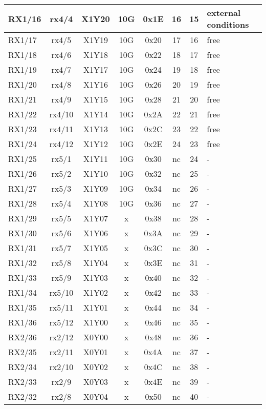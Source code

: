 \begin{longtable}{|l|c|c|c|c|c|c|l|}
RX1/16 & rx4/4  & X1Y20 & 10G & 0x1E & 16 & 15 & external conditions\\\hline
RX1/17 & rx4/5  & X1Y19 & 10G & 0x20 & 17 & 16 & free\\\hline
RX1/18 & rx4/6  & X1Y18 & 10G & 0x22 & 18 & 17 & free\\\hline
RX1/19 & rx4/7  & X1Y17 & 10G & 0x24 & 19 & 18 & free\\\hline
RX1/20 & rx4/8  & X1Y16 & 10G & 0x26 & 20 & 19 & free\\\hline
RX1/21 & rx4/9  & X1Y15 & 10G & 0x28 & 21 & 20 & free\\\hline
RX1/22 & rx4/10 & X1Y14 & 10G & 0x2A & 22 & 21 & free\\\hline
RX1/23 & rx4/11 & X1Y13 & 10G & 0x2C & 23 & 22 & free\\\hline
RX1/24 & rx4/12 & X1Y12 & 10G & 0x2E & 24 & 23 & free\\\hline
RX1/25 & rx5/1  & X1Y11 & 10G & 0x30 & nc & 24 & -\\\hline
RX1/26 & rx5/2  & X1Y10 & 10G & 0x32 & nc & 25 & -\\\hline
RX1/27 & rx5/3  & X1Y09 & 10G & 0x34 & nc & 26 & -\\\hline
RX1/28 & rx5/4  & X1Y08 & 10G & 0x36 & nc & 27 & -\\\hline
RX1/29 & rx5/5  & X1Y07 &  x   & 0x38 & nc & 28 & -\\\hline
RX1/30 & rx5/6  & X1Y06 &  x   & 0x3A & nc & 29 & -\\\hline
RX1/31 & rx5/7  & X1Y05 &  x   & 0x3C & nc & 30 & -\\\hline
RX1/32 & rx5/8  & X1Y04 &  x   & 0x3E & nc & 31 & -\\\hline
RX1/33 & rx5/9  & X1Y03 &  x   & 0x40 & nc & 32 & -\\\hline
RX1/34 & rx5/10 & X1Y02 &  x   & 0x42 & nc & 33 & -\\\hline
RX1/35 & rx5/11 & X1Y01 &  x   & 0x44 & nc & 34 & -\\\hline
RX1/36 & rx5/12 & X1Y00 &  x   & 0x46 & nc & 35 & -\\\hline
RX2/36 & rx2/12 & X0Y00 &  x   & 0x48 & nc & 36 & -\\\hline
RX2/35 & rx2/11 & X0Y01 &  x   & 0x4A & nc & 37 & -\\\hline
RX2/34 & rx2/10 & X0Y02 &  x   & 0x4C & nc & 38 & -\\\hline
RX2/33 & rx2/9  & X0Y03 &  x   & 0x4E & nc & 39 & -\\\hline
RX2/32 & rx2/8  & X0Y04 &  x   & 0x50 & nc & 40 & -\\\hline

\end{longtable}

